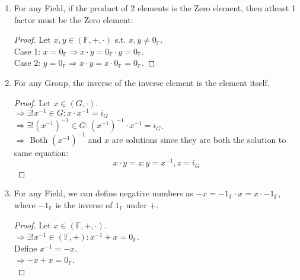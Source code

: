 \documentclass{article}
\begin{document}
\begin{enumerate}
\begin{proof}
					$\Rightarrow 0_{\mathbb{F}} \cdot x = i_{(\mathbb{F}, +)} \cdot x = (i_{(\mathbb{F}, +)} + i_{(\mathbb{F}, +)}) \cdot x = (i_{(\mathbb{F}, +)} \cdot x) + (i_{(\mathbb{F}, +)} \cdot x)$. \\
					Let $z = i_{(\mathbb{F}, +)} \cdot x$. \\
					$\Rightarrow z = z + z$. \\
					$\Rightarrow z + z^{-1} = (z + z) + z^{-1}$. \\
					$\Rightarrow z + z^{-1} = z + (z + z^{-1})$. \\
					$\Rightarrow i_{(\mathbb{F}, +)} = z + i_{(\mathbb{F}, +)}$. \\
					$\Rightarrow i_{(\mathbb{F}, +)} = z$. \\
					$\Rightarrow 0_{\mathbb{F}} = z$. \\
					$\Rightarrow 0_{\mathbb{F}} = 0_{\mathbb{F}} \cdot x$. \\

					$\Rightarrow x \cdot 0_{\mathbb{F}} = 0_{\mathbb{F}} \cdot x = 0_{\mathbb{F}}$.
				\end{proof}
				
				\item For any Field, if the product of 2 elements is the Zero element, then atleast 1 factor must be the Zero element:
				\begin{proof}
					Let $x, y \in (\mathbb{F}, +, \cdot)$ s.t. $x, y \neq 0_{\mathbb{F}}$. \\
					Case 1: $x = 0_{\mathbb{F}} \Rightarrow x \cdot y = 0_{\mathbb{F}} \cdot y = 0_{\mathbb{F}}$. \\
					Case 2: $y = 0_{\mathbb{F}} \Rightarrow x \cdot y = x \cdot 0_{\mathbb{F}} = 0_{\mathbb{F}}$.
				\end{proof}
				\item For any Group, the inverse of the inverse element is the element itself.
				\begin{proof}
					Let $x \in (G, \cdot)$. \\
					$\Rightarrow \exists ! x^{-1} \in G: x \cdot x^{-1} = i_G$ \\
					$\Rightarrow \exists ! ({x^{-1}})^{-1} \in G: ({x^{-1}})^{-1} \cdot x^{-1} = i_G$. \\
					$\Rightarrow$ Both $({x^{-1}})^{-1}$ and $x$ are solutions since they are both the solution to same equation:
					$$x \cdot y = z: y = x^{-1}, z = i_G$$
				\end{proof}

				\item For any Field, we can define negative numbers as $-x = -1_\mathbb{F} \cdot x = x \cdot -1_\mathbb{F}$, where $-1_\mathbb{F}$ is the inverse of $1_\mathbb{F}$ under $+$.
				\begin{proof}
					Let $x \in (\mathbb{F}, +, \cdot)$. \\
					$\Rightarrow \exists !x^{-1} \in (\mathbb{F}, +): x^{-1} + x = 0_\mathbb{F}$. \\
					Define $x^{-1} = -x$. \\
					$\Rightarrow -x + x = 0_\mathbb{F}$. \\
					

\end{proof}
\end{enumerate}
\end{document}

